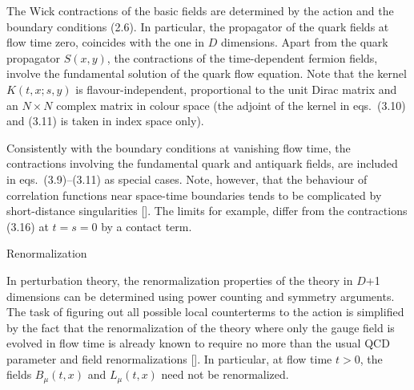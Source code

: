 The Wick contractions of the basic fields
are determined by the action and the boundary conditions (2.6).
In particular, the propagator of
the quark fields at flow time zero,
coincides with the one in $D$ dimensions.
Apart from the quark propagator $S(x,y)$, 
the contractions of the time-dependent fermion fields,
involve the fundamental solution
of the quark flow equation. Note that the
kernel $K(t,x;s,y)$ is flavour-independent, proportional
to the unit Dirac matrix and 
an $N\times N$ complex matrix in colour space (the adjoint of
the kernel in eqs.~(3.10) and (3.11) is 
taken in index space only). 

Consistently with the boundary conditions at vanishing flow time,
the contractions 
involving the fundamental quark and antiquark fields,
are included in eqs.~(3.9)--(3.11) as special cases.
Note, however, that the behaviour of 
correlation functions 
near space-time boundaries tends to 
be complicated by short-distance singularities
[\cite{Symanzik}]. 
The limits
for example,
differ from the contractions (3.16) at $t=s=0$ by a contact term.


 Renormalization

In perturbation theory, the renormalization properties of
the theory in $D$+1 dimensions can
be determined using power counting and 
symmetry arguments.
The task of figuring out all possible local counterterms
to the action is simplified by the fact that the renormalization of
the theory where only the gauge field is evolved in flow time
is already known to require no more than the usual
QCD parameter and field renormalizations [\cite{RenFlow}]. In particular,
at flow time $t>0$,
the fields $B_{\mu}(t,x)$ and $L_{\mu}(t,x)$ need not
be renormalized. 

